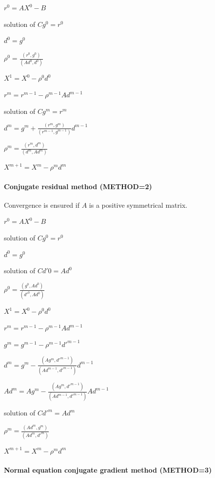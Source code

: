 
$r^{0}  =  A X^{0} - B$

solution of $Cg^{0}  =  r^{0}$

$d^{0} = g^{0}$

$\rho ^{0} = \frac{(r^{0},g^{0})}{(Ad^{0},d^{0})}$

$X^{1}  =  X^{0}  -  \rho ^{0} d^{0}$


$r^{m}  =  r^{m-1}  -  \rho ^{m-1} A d^{m-1}$

solution of $Cg^{m}  =  r^{m}$

$d^{m} = g^{m} + \frac{(r^{m},g^{m})}{(r^{m-1},g^{m-1})} d^{m-1}$

$\rho ^{m} = \frac{(r^{m},d^{m})}{(d^{m},Ad^{m})}$

$X^{m+1}  =  X^{m}  -  \rho ^{m} d^{m}$

\paragraph{Conjugate residual method (METHOD=2)}

Convergence is ensured if $A$ is a positive symmetrical matrix.


$r^{0}  =  A X^{0} - B$

solution of $Cg^{0}  =  r^{0}$

$d^{0}  =  g^{0}$

solution of $Cd'0  =  Ad^{0}$

$\rho ^{0} = \frac{(g^{0},Ad^{0})}{(d'^{0},Ad^{0})}$

$X^{1}  =  X^{0}  -  \rho ^{0} d^{0}$


$r^{m}  =  r^{m-1}  -  \rho ^{m-1} A d^{m-1}$

$g^{m}  =  g^{m-1}  -  \rho ^{m-1} d'^{m-1}$

$d^{m} = g^{m} - \frac{(Ag^{m},d'^{m-1})}{(Ad^{m-1},d'^{m-1})} d^{m-1}$

$Ad^{m} = Ag^{m} - \frac{(Ag^{m},d'^{m-1})}{(Ad^{m-1},d'^{m-1})} Ad^{m-1}$

solution of $Cd'^{m}  =  Ad^{m}$

$\rho ^{m} = \frac{(Ad^{m},g^{m})}{(Ad^{m},d'^{m})}$

$X^{m+1}  =  X^{m}  -  \rho ^{m} d^{m}$

\paragraph{Normal equation conjugate gradient method (METHOD=3)}

